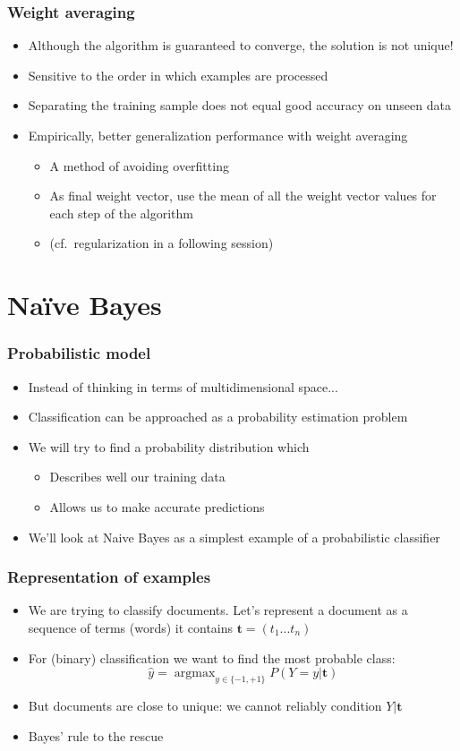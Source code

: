 \documentclass[14pt,mathserif,dvipsnames,usenames]{beamer}
\DeclareMathOperator*{\argmax}{argmax}
\newcommand{\voc}[1]{{\color{ForestGreen}#1}}
\begin{document}
\begin{frame}
 \frametitle{Weight averaging}
\begin{itemize}
\item Although the algorithm is guaranteed to converge, the solution
  is not unique!
\item Sensitive to the order in which examples are processed
\item Separating the training sample does not equal good accuracy on
  unseen data
\item Empirically, better generalization performance with
  \voc{weight averaging}
\begin{itemize}
\item A method of avoiding overfitting
\item As final weight vector, use the mean of all the weight vector
  values for each step of the algorithm
\item (cf.\ regularization in a following session)
\end{itemize}
\end{itemize}
\end{frame}


\section{Na{\"i}ve Bayes}
\begin{frame}
  \frametitle{Probabilistic model}
  \begin{itemize}
  \item Instead of thinking in terms of multidimensional space...
  \item Classification can be approached as a probability estimation problem
  \item We will try to find a probability distribution which
    \begin{itemize}
    \item  Describes
    well our training data 
  \item Allows us  to make accurate predictions 
    \end{itemize}
  \item We'll look at Naive Bayes as a simplest example of a
    probabilistic classifier
  \end{itemize}
\end{frame}


\begin{frame}
  \frametitle{Representation of examples}
  \begin{itemize}
    \item We are trying to classify documents. Let's
    represent a document as a sequence of terms (words) it contains
    $\mathbf{t} = (t_1...t_n)$

  \item For (binary) classification we want to find the most probable class:
    \[ \hat{y} = \argmax_{y \in \{-1,+1\}} P(Y=y|\mathbf{t}) \]
  \item But documents are close to unique: we cannot reliably
    condition $Y|\mathbf{t}$
  \item Bayes' rule to the rescue
  \end{itemize}
\end{frame}
\end{document}

